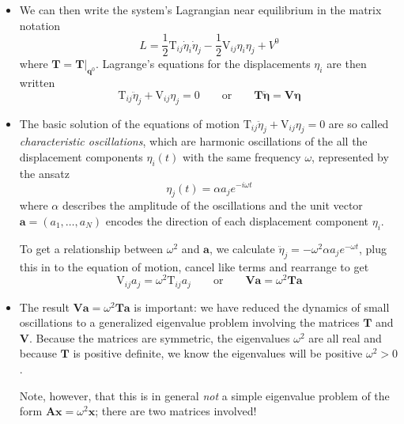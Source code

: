 \documentclass[11pt, a4paper]{article}
\newcommand{\eqtext}[1]{\qquad \text{#1} \qquad}
\newcommand{\bddot}[1]{\ddot{\bm{#1}}} %
\newcommand{\mat}[1]{\mathbf{#1}} %
\begin{document}
\begin{itemize}
	\item We can then write the system's Lagrangian near equilibrium in the matrix notation
	\begin{equation*}
		L = \frac{1}{2} \mathrm{T}_{ij}\dot{\eta}_{i}\dot{\eta}_{j} - \frac{1}{2}\mathrm{V}_{ij}\eta_{i}\eta_{j} + V^{0}
	\end{equation*}
	where $ \mat{T} = \mat{T}\big |_{\bm{q}^{0}} $. Lagrange's equations for the displacements $ \eta_{i} $ are then written
	\begin{equation*}
		\mathrm{T}_{ij} \ddot{\eta}_{j} + \mathrm{V}_{ij} \eta_{j} = 0 \eqtext{or} \mat{T} \bddot{\eta} = \mat{V} \bm{\eta}
	\end{equation*}
	
	\item The basic solution of the equations of motion $ \mathrm{T}_{ij} \ddot{\eta}_{j} + \mathrm{V}_{ij} \eta_{j} = 0 $ are so called \textit{characteristic oscillations}, which are harmonic oscillations of the all the displacement components $ \eta_{i}(t) $ with the same frequency $ \omega $, represented by the ansatz
	\begin{equation*}
		\eta_{j}(t) = \alpha a_{j} e^{-i\omega t}
	\end{equation*}
	where $ \alpha $ describes the amplitude of the oscillations and the unit vector $ \bm{a} = (a_{1}, \ldots, a_{N}) $ encodes the direction of each displacement component $ \eta_{i} $. 
	
	To get a relationship between $ \omega^{2} $ and $ \bm{a} $, we calculate $ \ddot{\eta}_{j} = -\omega^{2}\alpha a_{j}e^{-\omega t}  $, plug this in to the equation of motion, cancel like terms and rearrange to get
	\begin{equation*}
		\mathrm{V}_{ij} a_{j} = \omega^{2}\mathrm{T}_{ij}a_{j} \eqtext{or} \mat{V} \bm{a} = \omega^{2} \mat{T} \bm{a} 
	\end{equation*}

	\item The result $ \mat{V} \bm{a} = \omega^{2} \mat{T} \bm{a}  $ is important: we have reduced the dynamics of small oscillations to a generalized eigenvalue problem involving the matrices $ \mat{T} $ and $ \mat{V} $. Because the matrices are symmetric, the eigenvalues $ \omega^{2} $ are all real and because $ \mat{T} $ is positive definite, we know the eigenvalues will be positive $ \omega^{2} > 0 $.
	

	Note, however, that this is in general \textit{not} a simple eigenvalue problem of the form $ \mat{A} \bm{x} = \omega^{2} \bm{x} $; there are two matrices involved!
	
	
\end{itemize}
\end{document}
